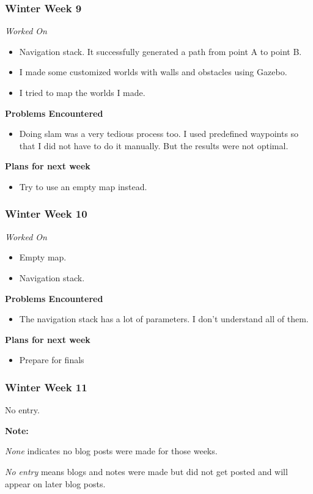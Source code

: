 \documentclass[compsoc,draftclsnofoot,onecolumn,10pt]{IEEEtran}
\begin{document}
\subsubsection*{Winter Week 9}
\textit{Worked On}
\begin{itemize}
    \item Navigation stack. It successfully generated a path from point A to point B.
    \item I made some customized worlds with walls and obstacles using Gazebo.
    \item I tried to map the worlds I made.
\end{itemize}
\textbf{Problems Encountered}
\begin{itemize}
  \item Doing slam was a very tedious process too. I used predefined waypoints so that I did not have to do it manually. But the results were not optimal.
\end{itemize}
\textbf{Plans for next week}
\begin{itemize}
  \item Try to use an empty map instead.
\end{itemize}



\subsubsection*{Winter Week 10}
\textit{Worked On}
\begin{itemize}
    \item Empty map.
    \item Navigation stack.
\end{itemize}
\textbf{Problems Encountered}
\begin{itemize}
  \item The navigation stack has a lot of parameters. I don't understand all of them.
\end{itemize}
\textbf{Plans for next week}
\begin{itemize}
  \item Prepare for finals
\end{itemize}


\subsubsection*{Winter Week 11}
No entry.



\textbf{Note:}\par
\textit{None} indicates no blog posts were made for those weeks.\par
\textit{No entry} means blogs and notes were made but did not get posted and will
appear on later blog posts.
\end{document}
